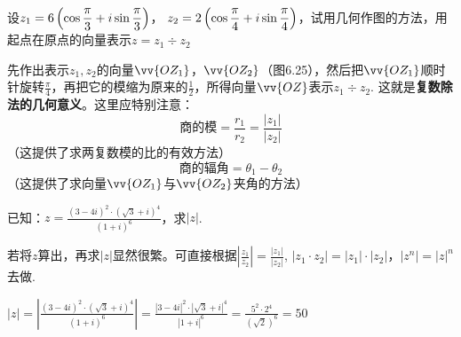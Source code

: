 \begin{example}
设$z_1=6\left(\cos\dfrac{\pi}{3}+i\sin\dfrac{\pi}{3}\right)$，
$z_2=2\left(\cos\dfrac{\pi}{4}+i\sin\dfrac{\pi}{4}\right)$，试用几何作图的方法，用起点在原点的向量表示$z=z_1\div z_2$
\end{example}

\noindent
\begin{minipage}{.55\textwidth}
\begin{solution}
先作出表示$z_1,z_2$的向量$\vv{OZ_1}$，$\vv{OZ_2}$（图6.25），然后把$\vv{OZ_1}$顺时针旋转$\frac{\pi}{4}$，再把它的模缩为原来的$\frac{1}{2}$，所得向量$\vv{OZ}$表示$z_1\div z_2$. 这就是\textbf{复数除法的几何意义}。这里应特别注意：
\[\text{商的模}=\frac{r_1}{r_2}=\frac{|z_1|}{|z_2|}\]
（这提供了求两复数模的比的有效方法）
\[\text{商的辐角}=\theta_1-\theta_2\]
（这提供了求向量$\vv{OZ_1}$与$\vv{OZ_2}$夹角的方法）
\end{solution}    
\end{minipage}\hfill
\begin{minipage}{.4\textwidth}
\centering
{}
\end{minipage}

\begin{example}
    已知：$z=\frac{(3-4i)^2\cdot (\sqrt{3}+i)^4}{(1+i)^6}$，求$|z|$.
\end{example}

\begin{analyze}
若将$z$算出，再求$|z|$显然很繁。可直接根据$\left|\frac{z_1}{z_2}\right|=\frac{|z_1|}{|z_2|}$, $|z_1\cdot z_2|=|z_1|\cdot |z_2|$，$|z^n|=|z|^n$去做.    
\end{analyze}

\begin{solution}
$|z|=\left|\frac{(3-4i)^2\cdot (\sqrt{3}+i)^4}{(1+i)^6}\right|=\frac{|3-4i|^2\cdot \left|\sqrt{3}+i\right|^4}{|1+i|^6}=\frac{5^2\cdot 2^4}{\left(\sqrt{2}\right)^6}=50
$    
\end{solution}

